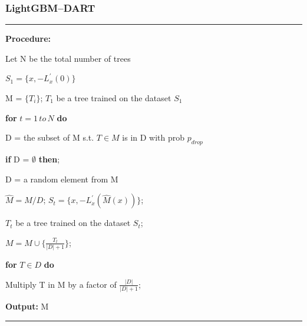 \documentclass[usenames,dvipsnames]{beamer}
\begin{document}
\begin{frame}
\frametitle{LightGBM--DART}
\noindent\rule[0.10\baselineskip]{\textwidth}{0.75pt}
    \textbf{Procedure:}\par
    \hspace*{32pt}  Let N be the total number of trees \par
    \hspace*{32pt}  $S_1 = \{x, -L_x^{'}(0)\}$\par
    \hspace*{32pt}  M = $\{T_i\}$; $T_1$ be a tree trained on the dataset $S_1$\par
    \hspace*{32pt}  \textbf{for} $t = 1\,to\,N$ \textbf{do}\par
    \hspace*{48pt}  D = the subset of M s.t. $T\in M$ is in D with prob $p_{drop}$\par
    \hspace*{48pt}  \textbf{if} D = $\emptyset$ \textbf{then};\par
    \hspace*{64pt}  D = a random element from M\par
    \hspace*{48pt}  $\hat{M}  = M \slash D$; $S_t = \{x, -L_x^{'}(\hat{M}(x))\}$;\par
    \hspace*{48pt}  $T_t$ be a tree trained on the dataset $S_t$;\par
    \hspace*{48pt}  $M = M \cup \{\frac{T_t}{|D|+1}\}$;\par
    \hspace*{48pt}  \textbf{for} $T\in D$ \textbf{do}\par
    \hspace*{64pt}  Multiply T in M by a factor of $\frac{|D|}{|D|+1}$;\par
    \textbf{Output:} M
\noindent\rule[0.10\baselineskip]{\textwidth}{0.75pt}\par
\end{frame}
\end{document}
